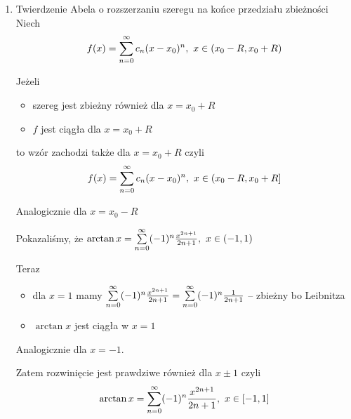 \begin{enumerate}
\begin{przyklad}
    Mamy $ \int \frac{1}{1+x^2} \,dx = \arctan x + C $. Wystarczy zatem rozwinąć w szereg funkcję $ \frac{1}{1+x^2} $, a potem obliczyć całkę.

    Korzystając z rozwinięcia $ \frac{1}{1-x} = \suminfty{0} x^n, \ x\in(-1, 1) $
    $$ \frac{1}{1+x^2} = \frac{1}{1 - (-x^2)} = \suminfty{0} (-x^2)^n = \suminfty{0} (-1)^n x^{2n}$$

    Przedział zbieżności: $ x^2\in(-1, 1) \Leftrightarrow x\in(-1, 1) $.

    Zatem

    $$ \arctan x = \int \frac{1}{1+x^2} \,dx = \arctan 0 + \suminfty{0} \int (-1)^n x^{2n} \,dx
    = \suminfty{0} (-1)^n \frac{x^{2n+1}}{2n+1}, \ x\in(-1, 1) $$
    \end{przyklad}

    \item 
    
    \begin{tw}{Twierdzenie Abela o rozszerzaniu szeregu na końce przedziału zbieżności}
    Niech
    $$ f(x) = \sum\limits_{n = 0}^{\infty} c_n (x - x_0)^n, \ x\in (x_0 - R, x_0 + R)$$

    Jeżeli
    \begin{itemize}
        \item szereg jest zbieżny również dla $ x = x_0 + R $
        \item $f$ jest ciągła dla $ x = x_0 + R $
    \end{itemize}

    to wzór zachodzi także dla $ x = x_0 + R $ czyli
    $$ f(x) = \sum\limits_{n = 0}^{\infty} c_n (x - x_0)^n, \ x\in (x_0 - R, x_0 + R] $$

    Analogicznie dla $ x = x_0 - R $
    \end{tw}

    \begin{przyklad}

    Pokazaliśmy, że $ \arctan x = \sum\limits_{n = 0}^{\infty} (-1)^n \frac{x^{2n+1}}{2n+1}, \ x\in (-1, 1) $

    Teraz

    \begin{itemize}
        \item dla $x = 1$ mamy $ \sum\limits_{n = 0}^{\infty} (-1)^n \frac{x^{2n+1}}{2n+1} = \sum\limits_{n = 0}^{\infty} (-1)^n \frac{1}{2n+1} $ -- zbieżny bo Leibnitza
        \item $ \arctan x $ jest ciągła w $x = 1$
    \end{itemize}

    Analogicznie dla $ x = -1$.

    Zatem rozwinięcie jest prawdziwe również dla $x \pm 1$ czyli
    $$ \arctan x = \sum\limits_{n = 0}^{\infty} (-1)^n \frac{x^{2n+1}}{2n+1}, \ x\in [-1, 1] $$
    \end{przyklad}
\end{enumerate}

